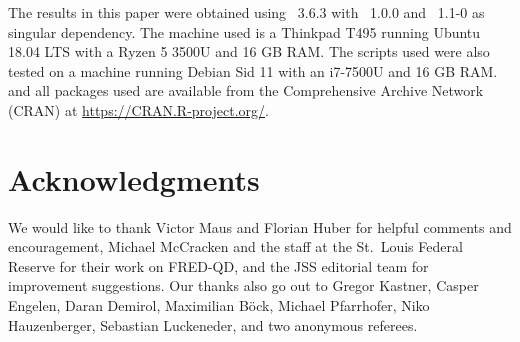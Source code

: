 \documentclass[article,nojss]{jss} %
\begin{document}
The results in this paper were obtained using ~3.6.3 with ~1.0.0 and ~{1.1-0} as singular dependency. The machine used is a Thinkpad T495 running Ubuntu 18.04 LTS with a Ryzen 5 3500U and 16 GB RAM. The scripts used were also tested on a machine running Debian Sid 11 with an i7-7500U and 16 GB RAM.
 and all packages used are available from the Comprehensive  Archive Network (CRAN) at \url{https://CRAN.R-project.org/}.


\section*{Acknowledgments}

We would like to thank Victor Maus and Florian Huber for helpful comments and encouragement, Michael McCracken and the staff at the St.~Louis Federal Reserve for their work on FRED-QD, and the JSS editorial team for improvement suggestions. Our thanks also go out to Gregor Kastner, Casper Engelen, Daran Demirol, Maximilian B\"ock, Michael Pfarrhofer, Niko Hauzenberger, Sebastian Luckeneder, and two anonymous referees.



\clearpage





\newpage
\end{document}

